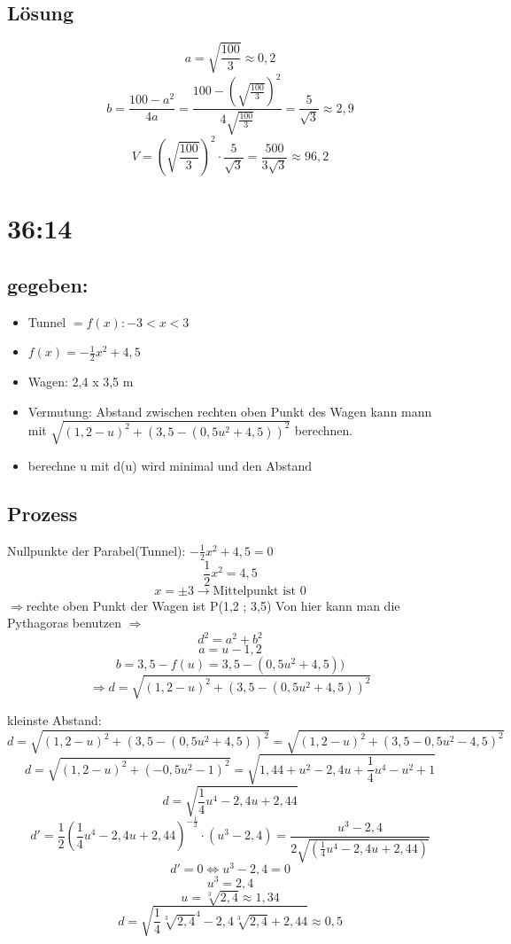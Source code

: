 \documentclass[twocolumn]{article}
\begin{document}
\subsection{Lösung}
\[a = \sqrt{\frac{100}3} \approx 0,2\]
\[b = \frac {100-a^2}{4a} = \frac {100-(\sqrt{\frac{100}3})^2}{4\sqrt{\frac{100}3}} =\frac5{\sqrt3} \approx 2,9\]
\[V = (\sqrt{\frac{100}3})^2 \cdot \frac5{\sqrt3} = \frac {500}{3\sqrt3} \approx 96,2\]

\section{36:14}
\subsection{gegeben:}
\begin{itemize}
\item Tunnel $= f(x) : -3 < x <3$
\item $f(x) = -\frac12 x^2+4,5 $
\item Wagen: 2,4 x 3,5 m
\item Vermutung: Abstand zwischen rechten oben Punkt des Wagen kann mann mit $\sqrt{(1,2-u)^2+(3,5-(0,5u^2+4,5))^2}$ berechnen.
\item berechne u mit d(u) wird minimal und den Abstand
\end{itemize}

\subsection {Prozess}
Nullpunkte der Parabel(Tunnel): $-\frac12 x^2+4,5 = 0$
\[\frac12 x^2 = 4,5\]
\[x = \pm 3 \rightarrow \text{Mittelpunkt ist }0\]
$\Rightarrow $rechte oben Punkt der Wagen ist P(1,2 ; 3,5)
Von hier kann man die Pythagoras benutzen $\Rightarrow$ 
\[d^2 = a^2 + b^2\]
\[a = u-1,2\]
\[ b = 3,5-f(u) = 3,5-(0,5u^2+4,5))\]
\[ \Rightarrow d = \sqrt{(1,2-u)^2+(3,5-(0,5u^2+4,5))^2}\]

kleinste Abstand:
\[d =\sqrt{(1,2-u)^2+(3,5-(0,5u^2+4,5))^2} = \sqrt{(1,2-u)^2+(3,5 - 0,5u^2-4,5)^2} \]
\[d= \sqrt{(1,2-u)^2+(- 0,5u^2-1)^2} = \sqrt{1,44+u^2-2,4u+\frac14u^4-u^2+1}\]
\[d = \sqrt{\frac14u^4-2,4u+2,44}\]
\[d' = \frac12 (\frac14u^4-2,4u+2,44) ^{-\frac12} \cdot (u^3-2,4) = \frac{u^3-2,4}{2 \sqrt{(\frac14u^4-2,4u+2,44)}}\]
\[d' = 0 \Leftrightarrow u^3-2,4 = 0\]
\[u^3 = 2,4\]
\[u = \sqrt[3]{2,4} \approx 1,34\]
\[d = \sqrt{\frac14\sqrt[3]{2,4}^4-2,4\sqrt[3]{2,4}+2,44} \approx  0,5\]
\end{document}
